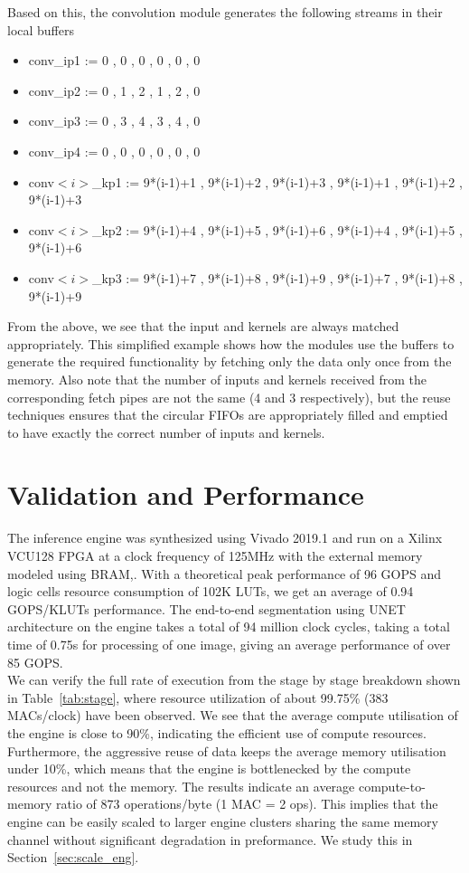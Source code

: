 \documentclass[a4paper,12pt, final]{report}
\begin{document}
Based on this, the convolution module generates the following streams in their local buffers

\begin{itemize}
	\item conv\_ip1 := 0 , 0 , 0 , 0 , 0 , 0
	\item conv\_ip2 := 0 , 1 , 2 , 1 , 2 , 0
	\item conv\_ip3 := 0 , 3 , 4 , 3 , 4 , 0
	\item conv\_ip4 := 0 , 0 , 0 , 0 , 0 , 0
	\item conv$<i>$\_kp1 := 9*(i-1)+1 , 9*(i-1)+2 , 9*(i-1)+3 , 9*(i-1)+1 , 9*(i-1)+2 , 9*(i-1)+3
	\item conv$<i>$\_kp2 := 9*(i-1)+4 , 9*(i-1)+5 , 9*(i-1)+6 , 9*(i-1)+4 , 9*(i-1)+5 , 9*(i-1)+6
	\item conv$<i>$\_kp3 := 9*(i-1)+7 , 9*(i-1)+8 , 9*(i-1)+9 , 9*(i-1)+7 , 9*(i-1)+8 , 9*(i-1)+9
\end{itemize}

From the above, we see that the input and kernels are always matched appropriately. This simplified example shows how the modules use the buffers to generate the required functionality by fetching only the data only once from the memory. Also note that the number of inputs and kernels received from the corresponding fetch pipes are not the same (4 and 3 respectively), but the reuse techniques ensures that the circular FIFOs are appropriately filled and emptied to have exactly the correct number of inputs and kernels.

\section{Validation and Performance}

The inference engine was synthesized using Vivado 2019.1 and run on a Xilinx VCU128 FPGA at a clock frequency of 125MHz with the external memory modeled using BRAM,. With a theoretical peak performance of 96 GOPS and logic cells resource consumption of 102K LUTs, we get an average of 0.94 GOPS/KLUTs performance. The end-to-end segmentation using UNET architecture on the engine takes a total of 94 million clock cycles, taking a total time of 0.75s for processing of one image, giving an average performance of over 85 GOPS.
\\

We can verify the full rate of execution from the stage by stage breakdown shown in Table~\ref{tab:stage}, where resource utilization of about 99.75\% (383 MACs/clock) have been observed. We see that the average compute utilisation of the engine is close to 90\%, indicating the efficient use of compute resources. Furthermore, the aggressive reuse of data keeps the average memory utilisation under 10\%, which means that the engine is bottlenecked by the compute resources and not the memory. The results indicate an average compute-to-memory ratio of 873 operations/byte (1 MAC = 2 ops).  This implies that the engine can be easily scaled to larger engine clusters sharing the same memory channel without significant degradation in preformance. We study this in Section~\ref{sec:scale_eng}. 
\\
\end{document}
